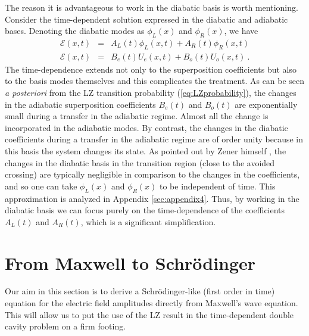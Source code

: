 \documentclass[twocolumn,english,pra,aps,superscriptaddress,floatfix]{revtex4-1}
\begin{document}
The reason it is advantageous to work in the diabatic basis is worth mentioning. Consider the time-dependent solution expressed in the diabatic and adiabatic bases. Denoting the diabatic modes as $\phi_{L}(x)$ and $\phi_{R}(x)$, we have 
\begin{eqnarray}
\mathcal{E}(x,t) & = & A_{L}(t)\phi_{L}(x,t)+A_{R}(t)\phi_{R}(x,t) \label{eq:diabatic expansion} \\
\mathcal{E}(x,t) & = & B_{e}(t) U_{e}(x,t)+B_{o}(t) U_{o}(x,t) \ .
\end{eqnarray}
The time-dependence extends not only to the superposition coefficients but also to the basis modes themselves and this complicates the treatment. As can be seen \emph{a posteriori} from the LZ transition probability (\ref{eq:LZprobability}), the changes in the adiabatic superposition coefficients $B_{e}(t)$ and $B_{o}(t)$ are exponentially small during a transfer in the adiabatic regime. Almost all the change is incorporated in the adiabatic modes.
By contrast, the changes in the diabatic coefficients during a transfer in the adiabatic regime are of order unity because in this basis the system changes its state. As pointed out by Zener himself \cite{zener32}, the changes in the diabatic basis in the transition region (close to the avoided crossing) are typically negligible in comparison to the changes in the coefficients, and so one can take $\phi_{L}(x)$ and $\phi_{R}(x)$ to be independent of time. This approximation is analyzed in Appendix \ref{sec:appendix4}. Thus, by working in the diabatic basis  we can focus purely on the time-dependence of the coefficients $A_{L}(t)$ and $A_{R}(t)$, which is a significant simplification.



\section{From Maxwell to Schr\"{o}dinger}
\label{sec:frommaxwelltoschrodinger}


Our aim in this section is to derive a Schr\"{o}dinger-like (first order in time) equation for the electric field amplitudes directly from Maxwell's wave equation. This will allow us to put the use of the LZ result in the time-dependent double cavity problem on a firm footing. 
\end{document}
